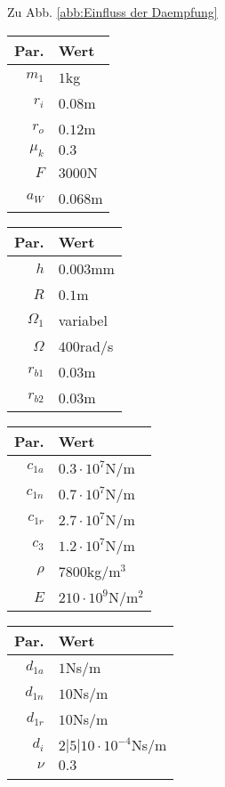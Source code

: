 Zu Abb. \ref{abb:Einfluss der Daempfung}
\begin{center}
	\begin{tabular}{r|l}
		Par.&Wert\\\hline
		$m_1$&$1$kg\\
		$r_i$&$0.08$m\\
		$r_o$&$0.12$m\\
		$\mu_k$& $0.3$\\
		$F$&$3000$N\\
		$a_W$&$0.068$m\\
	\end{tabular}\hfill
	\begin{tabular}{r|l}
		Par.&Wert\\\hline
		$h$&$0.003$mm\\
		$R$&$0.1$m\\
		$\Omega_1$&variabel\\
		$\Omega$& $400$rad/s \\
		$r_{b1}$&$0.03$m\\
		$r_{b2}$&$0.03$m\\
	\end{tabular}\hfill
	\begin{tabular}{r|l}
		Par.&Wert\\\hline
		$c_{1a}$&$0.3\cdot10^{7}$N/m\\
		$c_{1n}$&$0.7\cdot10^{7}$N/m\\
		$c_{1r}$&$2.7\cdot10^{7}$N/m\\
		$c_{3}$&$1.2\cdot10^{7}$N/m\\
		$\rho$&$7800$kg/m$^3$\\
		$E$&$210\cdot10^9$N/m$^2$\\
	\end{tabular}\hfill
	\begin{tabular}{r|l}
		Par.&Wert\\\hline
		$d_{1a}$&$1$Ns/m\\
		$d_{1n}$&$10$Ns/m\\
		$d_{1r}$&$10$Ns/m\\
		$d_i$ &$2|5|10\cdot10^{-4}$Ns/m\\
		$\nu$&$0.3$\\
		&
	\end{tabular}
\end{center}